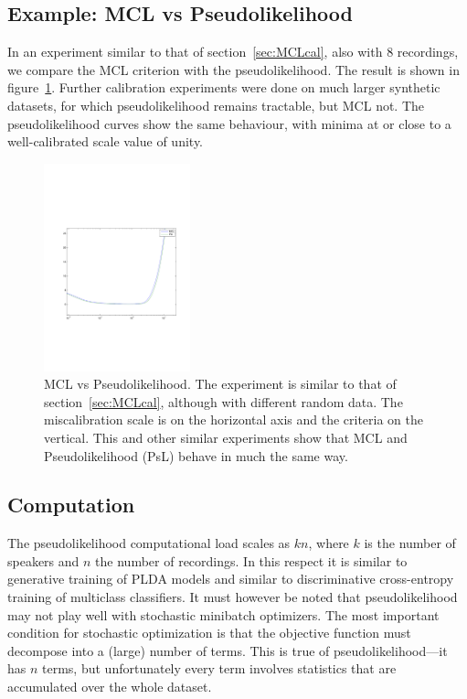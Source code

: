 \documentclass[a4paper,oneside,12pt,english]{report}
\begin{document}
\subsection{Example: MCL vs Pseudolikelihood}
In an experiment similar to that of section~\ref{sec:MCLcal}, also with 8 recordings, we compare the MCL criterion with the pseudolikelihood. The result is shown in figure~\ref{fig:MCL_vs_PsL}. Further calibration experiments were done on much larger synthetic datasets, for which pseudolikelihood remains tractable, but MCL not. The pseudolikelihood curves show the same behaviour, with minima at or close to a well-calibrated scale value of unity.
\begin{figure}[htb!]
\centering
\includegraphics[height=6cm,trim={0cm 7cm 0cm 8cm},clip]{SGME_calibration_MCL_vs_PsL.pdf}        %
\caption[MCL vs Pseudolikelihood]{MCL vs Pseudolikelihood. The experiment is similar to that of section~\ref{sec:MCLcal}, although with different random data. The miscalibration scale is on the horizontal axis and the criteria on the vertical. This and other similar experiments show that MCL and Pseudolikelihood (PsL) behave in much the same way.}
\label{fig:MCL_vs_PsL}
\end{figure}



\subsection{Computation}
The pseudolikelihood computational load scales as $kn$, where $k$ is the number of speakers and $n$ the number of recordings. In this respect it is similar to generative training of PLDA models and similar to discriminative cross-entropy training of multiclass classifiers. It must however be noted that pseudolikelihood may not play well with stochastic minibatch optimizers. The most important condition for stochastic optimization is that the objective function must decompose into a (large)  number of terms. This is true of pseudolikelihood---it has $n$ terms, but unfortunately every term involves statistics that are accumulated over the whole dataset. 
\end{document}
